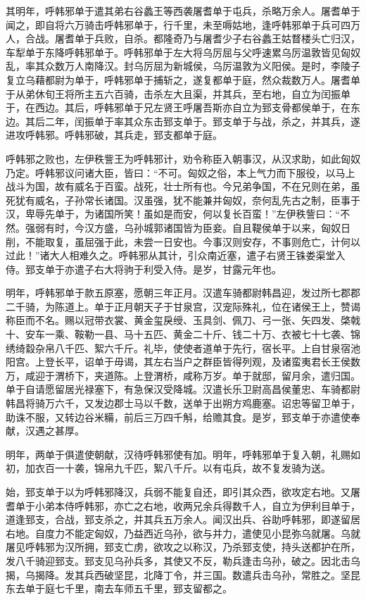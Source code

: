 \documentclass[]{article}
\begin{document}
其明年，呼韩邪单于遣其弟右谷蠡王等西袭屠耆单于屯兵，杀略万余人。屠耆单于闻之，即自将六万骑击呼韩邪单于，行千里，未至嗕姑地，逢呼韩邪单于兵可四万人，合战。屠耆单于兵败，自杀。都隆奇乃与屠耆少子右谷蠡王姑瞀楼头亡归汉，车犁单于东降呼韩邪单于。呼韩邪单于左大将乌厉屈与父呼速累乌厉温敦皆见匈奴乱，率其众数万人南降汉。封乌厉屈为新城侯，乌厉温敦为义阳侯。是时，李陵子复立乌藉都尉为单于，呼韩邪单于捕斩之，遂复都单于庭，然众裁数万人。屠耆单于从弟休旬王将所主五六百骑，击杀左大且渠，并其兵，至右地，自立为闰振单于，在西边。其后，呼韩邪单于兄左贤王呼屠吾斯亦自立为郅支骨都侯单于，在东边。其后二年，闰振单于率其众东击郅支单于。郅支单于与战，杀之，并其兵，遂进攻呼韩邪。呼韩邪破，其兵走，郅支都单于庭。

呼韩邪之败也，左伊秩訾王为呼韩邪计，劝令称臣入朝事汉，从汉求助，如此匈奴乃定。呼韩邪议问诸大臣，皆曰：``不可。匈奴之俗，本上气力而下服役，以马上战斗为国，故有威名于百蛮。战死，壮士所有也。今兄弟争国，不在兄则在弟，虽死犹有威名，子孙常长诸国。汉虽强，犹不能兼并匈奴，奈何乱先古之制，臣事于汉，卑辱先单于，为诸国所笑！虽如是而安，何以复长百蛮！''左伊秩訾曰：``不然。强弱有时，今汉方盛，乌孙城郭诸国皆为臣妾。自且鞮侯单于以来，匈奴日削，不能取复，虽屈强于此，未尝一日安也。今事汉则安存，不事则危亡，计何以过此！''诸大人相难久之。呼韩邪从其计，引众南近塞，遣子右贤王铢娄渠堂入侍。郅支单于亦遣子右大将驹于利受入侍。是岁，甘露元年也。

明年，呼韩邪单于款五原塞，愿朝三年正月。汉遣车骑都尉韩昌迎，发过所七郡郡二千骑，为陈道上。单于正月朝天子于甘泉宫，汉宠际殊礼，位在诸侯王上，赞谒称臣而不名。赐以冠带衣裳、黄金玺戾绶、玉具剑、佩刀、弓一张、矢四发、棨戟十、安车一乘、鞍勒一县、马十五匹、黄金二十斤、钱二十万、衣被七十七袭、锦绣绮縠杂帛八千匹、絮六千斤。礼毕，使使者道单于先行，宿长平。上自甘泉宿池阳宫。上登长平，诏单于毋谒，其左右当户之群臣皆得列观，及诸蛮夷君长王侯数万，咸迎于渭桥下，夹道陈。上登渭桥，咸称万岁。单于就邸，留月余，遣归国。单于自请愿留居光禄塞下，有急保汉受降城。汉遣长乐卫尉高昌侯董忠、车骑都尉韩昌将骑万六千，又发边郡士马以千数，送单于出朔方鸡鹿塞。诏忠等留卫单于，助诛不服，又转边谷米糒，前后三万四千斛，给赡其食。是岁，郅支单于亦遣使奉献，汉遇之甚厚。

明年，两单于俱遣使朝献，汉待呼韩邪使有加。明年，呼韩邪单于复入朝，礼赐如初，加衣百一十袭，锦帛九千匹，絮八千斤。以有屯兵，故不复发骑为送。

始，郅支单于以为呼韩邪降汉，兵弱不能复自还，即引其众西，欲攻定右地。又屠耆单于小弟本侍呼韩邪，亦亡之右地，收两兄余兵得数千人，自立为伊利目单于，道逢郅支，合战，郅支杀之，并其兵五万余人。闻汉出兵、谷助呼韩邪，即遂留居右地。自度力不能定匈奴，乃益西近乌孙，欲与并力，遣使见小昆弥乌就屠。乌就屠见呼韩邪为汉所拥，郅支亡虏，欲攻之以称汉，乃杀郅支使，持头送都护在所，发八千骑迎郅支。郅支见乌孙兵多，其使又不反，勒兵逢击乌孙，破之。因北击乌揭，乌揭降。发其兵西破坚昆，北降丁令，并三国。数遣兵击乌孙，常胜之。坚昆东去单于庭七千里，南去车师五千里，郅支留都之。
\end{document}
